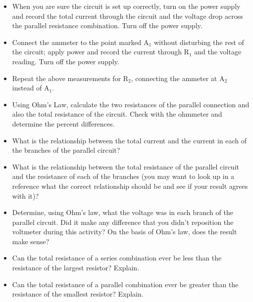 \begin{itemize}
\item When you are sure the circuit is set up correctly, turn on the power
supply and record the total current through the circuit and the voltage
drop across the parallel resistance combination. Turn off the power
supply.\vspace{10mm}

\item Connect the ammeter to the point marked A\( _{1} \) without disturbing
the rest of the circuit; apply power and record the current through
R\( _{1} \) and the voltage reading. Turn off the power supply.\vspace{10mm}

\item Repeat the above measurements for R\( _{2} \), connecting the ammeter
at A\( _{2} \) instead of A\( _{1} \).\vspace{10mm}

\item Using Ohm's Law, calculate the two resistances of the parallel connection
and also the total resistance of the circuit. Check with the ohmmeter
and determine the percent differences.\vspace{30mm}

\item What is the relationship between the total current and the current
in each of the branches of the parallel circuit?\vspace{15mm}

\item What is the relationship between the total resistance of the parallel
circuit and the resistance of each of the branches (you may want to
look up in a reference what the correct relationship should be and
see if your result agrees with it)?\vspace{15mm}

\item Determine, using Ohm's law, what the voltage was in each branch of
the parallel circuit. Did it make any difference that you didn't reposition
the voltmeter during this activity? On the basis of Ohm's law, does
the result make sense?\vspace{30mm}

\item Can the total resistance of a series combination ever be less than
the resistance of the largest resistor? Explain.\vspace{30mm}

\item Can the total resistance of a parallel combination ever be greater
than the resistance of the smallest resistor? Explain.\vspace{30mm}
\end{itemize}

